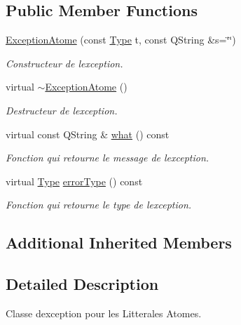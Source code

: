 \subsection*{Public Member Functions}
\begin{DoxyCompactItemize}
\item 
\hyperlink{class_exception_atome_a4facf977043886e2ea8539949d59a70f}{Exception\+Atome} (const \hyperlink{class_exception_atome_abb43c6c9a48f745dba9aaad0f721267d}{Type} t, const Q\+String \&s=\char`\"{}\char`\"{})
\begin{DoxyCompactList}\small\item\em Constructeur de l\textquotesingle{}exception. \end{DoxyCompactList}\item 
virtual \hyperlink{class_exception_atome_a6062e4843a817667c37a53014e31f81e}{$\sim$\+Exception\+Atome} ()\hypertarget{class_exception_atome_a6062e4843a817667c37a53014e31f81e}{}\label{class_exception_atome_a6062e4843a817667c37a53014e31f81e}

\begin{DoxyCompactList}\small\item\em Destructeur de l\textquotesingle{}exception. \end{DoxyCompactList}\item 
virtual const Q\+String \& \hyperlink{class_exception_atome_a7f44c61c6819f3bef675160fd201e4f2}{what} () const 
\begin{DoxyCompactList}\small\item\em Fonction qui retourne le message de l\textquotesingle{}exception. \end{DoxyCompactList}\item 
virtual \hyperlink{class_exception_atome_abb43c6c9a48f745dba9aaad0f721267d}{Type} \hyperlink{class_exception_atome_ac1756a673cf313054c118e6d3cccf843}{error\+Type} () const 
\begin{DoxyCompactList}\small\item\em Fonction qui retourne le type de l\textquotesingle{}exception. \end{DoxyCompactList}\end{DoxyCompactItemize}
\subsection*{Additional Inherited Members}


\subsection{Detailed Description}
Classe d\textquotesingle{}exception pour les Litterales Atomes. 

